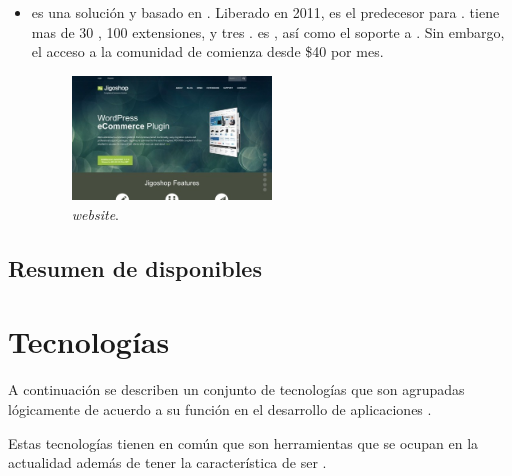 \begin{itemize}
	\item \textbf{\nameJigoshop} es una solución \ecommerce \freePC y \openSourcePC basado en \wordPressNAME. Liberado en 2011, \nameJigoshop es el predecesor para \nameWooCommerce. \nameJigoshop tiene mas de 30 \themes, 100 extensiones, y tres \theme \frameworksPC. \nameJigoshop es \freePC, así como el soporte a \wordPressOrg. Sin embargo, el acceso a la comunidad de \nameJigoshop comienza desde \$40 por mes.

	\begin{figure}[H]
		\centering
		\includegraphics[width=0.5\textwidth]{figuras/cap1/JigoshopWebsite.jpg}
		\caption{\nameJigoshop \textit{website}\cite{online_Jigoshop}.}
	\end{figure}

\end{itemize}


\subsection{Resumen de \frameworksPC disponibles}



\section{Tecnologías }\label{cap:estadoArte:tecnologias}
A continuación se describen un conjunto de tecnologías que son agrupadas lógicamente de acuerdo a su función en el desarrollo de aplicaciones \webINT.

Estas tecnologías tienen en común que son herramientas que se ocupan en la actualidad además de tener la característica de ser \openSourcePC. 

\subsection{\dataBaseDB}

